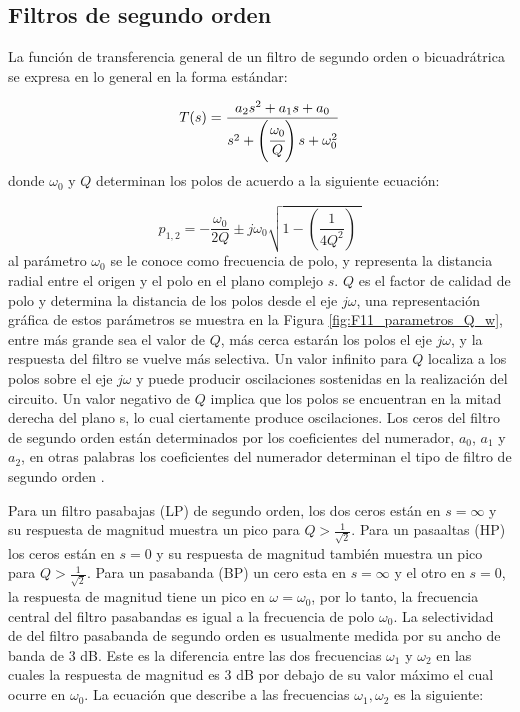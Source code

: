 		\subsection{Filtros de segundo orden}
	
	La función de transferencia general de un filtro de segundo orden o bicuadrátrica se expresa en lo general en la forma estándar:
	
	\begin{equation}
		T(s) = \frac{a_{2} s^{2} + a_{1}s + a_{0}}{s^{2} + \left( \cfrac{ \omega_{0} }{Q} \right)s + \omega_{0}^{2}}
	\end{equation}
	donde $\omega_{0}$ y $Q$ determinan los polos de acuerdo a la siguiente ecuación:
	
	\begin{equation}
		p_{1,2} = - \frac{\omega_{0}}{2 Q} \pm j \omega_{0} \sqrt{1 - \left(   \frac{1}{4 Q^{2}}  \right) \,\,}
	\end{equation}
	al parámetro $\omega_{0}$ se le conoce como frecuencia de polo, y representa la distancia radial entre el origen y el polo en el plano complejo $s$. $Q$ es el factor de calidad de polo y determina la distancia de los polos desde el eje $j\omega$, una representación gráfica de estos parámetros se muestra en la Figura \ref{fig:F11_parametros_Q_w}, entre más grande sea el valor de $Q$, más cerca estarán los polos el eje $j\omega$, y la respuesta del filtro se vuelve más selectiva. Un valor infinito para $Q$ localiza a los polos sobre el eje $j\omega$ y puede producir oscilaciones sostenidas en la realización del circuito. Un valor negativo de $Q$ implica que los polos se encuentran en la mitad derecha del plano s, lo cual ciertamente produce oscilaciones.
	Los ceros del filtro de segundo orden están determinados por los coeficientes del numerador, $a_{0}$, $a_{1}$ y $a_{2}$, en otras palabras los coeficientes del numerador determinan el tipo de filtro de segundo orden \cite{Sedra2015}.
	
	Para un filtro pasabajas (LP) de segundo orden, los dos ceros están en $s = \infty$ y su respuesta de magnitud muestra un pico para $Q > \frac{1}{\sqrt{2}}$. Para un pasaaltas (HP) los ceros están en $s = 0$ y su respuesta de magnitud también muestra un pico para $Q > \frac{1}{\sqrt{2}}$. Para un pasabanda (BP) un cero esta en $s = \infty$ y el otro en $s = 0$, la respuesta de magnitud tiene un pico en $\omega = \omega_{0}$, por lo tanto, la frecuencia central del filtro pasabandas es igual a la frecuencia de polo $\omega_{0}$. La selectividad de del filtro pasabanda de segundo orden es usualmente medida por su ancho de banda de 3 dB. Este es la diferencia entre las dos frecuencias $\omega_{1}$ y $\omega_{2}$ en las cuales la respuesta de magnitud es 3 dB por debajo de su valor máximo el cual ocurre en $\omega_{0}$. La ecuación que describe a las frecuencias $\omega_{1},\omega_{2}$ es la siguiente:
	
